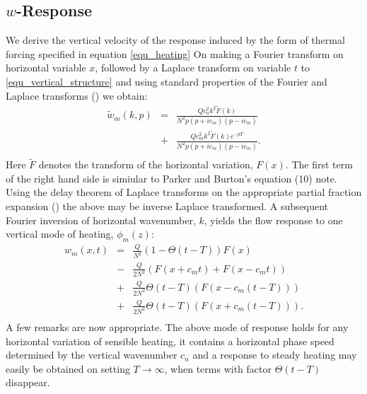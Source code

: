 \documentclass[a4paper,10pt]{article}
\newcommand{\heavi}{\Theta}
\begin{document}
\subsection{$w$-Response}
%
We derive the vertical velocity of the response induced by the form of thermal forcing specified in equation \ref{equ_heating}
On making a Fourier transform on horizontal variable $x$, followed by a Laplace transform 
on variable $t$ to \ref{equ_vertical_structure} and using standard properties of the Fourier and Laplace transforms 
 (\citep{arfken2013mathematical}) we obtain:
%
\begin{eqnarray}
\tilde{w}_m(k,p) & = & \frac{Q c_n^2 k^2 \tilde{F}(k) }{ N^2 p \left( p + i c_m \right) \left( p-i c_m \right)  } \\ \nonumber
                        & + &  \frac{Q c_m^2 k^2 \tilde{F}(k)  e^{-pT} }{ N^2 p \left( p + i c_m \right) \left( p-i c_m \right)  }. \\ \nonumber
\end{eqnarray}
%
Here $ \tilde{F}$ denotes the transform of the horizontal variation, $F(x)$. 
The first term of the right hand side is simiular to Parker and Burton's equation (10) note.
Using the delay theorem of Laplace transforms on the appropriate partial fraction expansion (\citep{arfken2013mathematical})
the above may be inverse Laplace transformed. A subsequent Fourier inversion of horizontal wavenumber, $k$, yields
the flow response to one vertical mode of heating, $\phi_m(z)$:
%
\begin{eqnarray}
\label{equ_PB2}
w_m(x,t) & = & \frac{Q}{N^2} \left( 1 - \heavi( t-T) \right) F(x) \\ \nonumber
              & - & \frac{Q}{2N^2} \left(  F(x + c_m t) + F(x - c_m t) \right) \\ \nonumber
             & + & \frac{Q}{2 N^2} \heavi( t-T) \left( F(x-c_m (t-T)) \right) \\ \nonumber
            & + & \frac{Q}{2 N^2} \heavi( t-T) \left( F(x+ c_m (t-T))  \right). \\ \nonumber
\end{eqnarray}
% 
A few remarks are now appropriate. The above mode of response holds for any horizontal variation of sensible heating, it 
contains a horizontal phase speed determined by the vertical wavenumber $c_n$ and a response to steady heating may 
easily be obtained on setting $T \rightarrow \infty$, when terms with factor $\heavi(t-T)$ disappear. 
\end{document}
